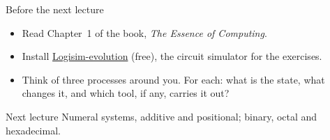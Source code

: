 \documentclass[10pt]{wosm-slides}
\begin{document}
\begin{frame}{Before the next lecture}
  \begin{itemize}
    \item Read Chapter~1 of the book, \emph{The Essence of Computing}.
    \item Install \href{https://github.com/logisim-evolution/logisim-evolution}{Logisim-evolution}
      (free), the circuit simulator for the exercises.
    \item Think of three processes around you. For each: what is the state, what
      changes it, and which tool, if any, carries it out?
  \end{itemize}

  \begin{block}{Next lecture }
    Numeral systems, additive and positional; binary, octal and hexadecimal.
  \end{block}
\end{frame}
\end{document}
